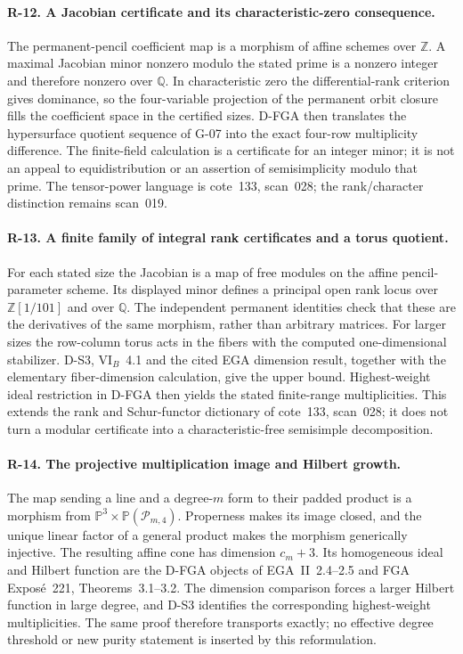 \paragraph{R-12. A Jacobian certificate and its characteristic-zero consequence.}
The permanent-pencil coefficient map is a morphism of affine schemes over $\mathbb Z$. A maximal Jacobian minor nonzero modulo the stated prime is a nonzero integer and therefore nonzero over $\mathbb Q$. In characteristic zero the differential-rank criterion gives dominance, so the four-variable projection of the permanent orbit closure fills the coefficient space in the certified sizes. D-FGA then translates the hypersurface quotient sequence of G-07 into the exact four-row multiplicity difference. The finite-field calculation is a certificate for an integer minor; it is not an appeal to equidistribution or an assertion of semisimplicity modulo that prime. The tensor-power language is cote~133, scan~028; the rank/character distinction remains scan~019.


\paragraph{R-13. A finite family of integral rank certificates and a torus quotient.}
For each stated size the Jacobian is a map of free modules on the affine pencil-parameter scheme. Its displayed minor defines a principal open rank locus over $\mathbb Z[1/101]$ and over $\mathbb Q$. The independent permanent identities check that these are the derivatives of the same morphism, rather than arbitrary matrices. For larger sizes the row-column torus acts in the fibers with the computed one-dimensional stabilizer. D-S3, VI$_B$~4.1 and the cited EGA dimension result, together with the elementary fiber-dimension calculation, give the upper bound. Highest-weight ideal restriction in D-FGA then yields the stated finite-range multiplicities. This extends the rank and Schur-functor dictionary of cote~133, scan~028; it does not turn a modular certificate into a characteristic-free semisimple decomposition.

\paragraph{R-14. The projective multiplication image and Hilbert growth.}
The map sending a line and a degree-$m$ form to their padded product is a morphism from $\mathbb P^3\times\mathbb P(\mathcal P_{m,4})$. Properness makes its image closed, and the unique linear factor of a general product makes the morphism generically injective. The resulting affine cone has dimension $c_m+3$. Its homogeneous ideal and Hilbert function are the D-FGA objects of EGA~II~2.4--2.5 and FGA Expos\'e~221, Theorems~3.1--3.2. The dimension comparison forces a larger Hilbert function in large degree, and D-S3 identifies the corresponding highest-weight multiplicities. The same proof therefore transports exactly; no effective degree threshold or new purity statement is inserted by this reformulation.

